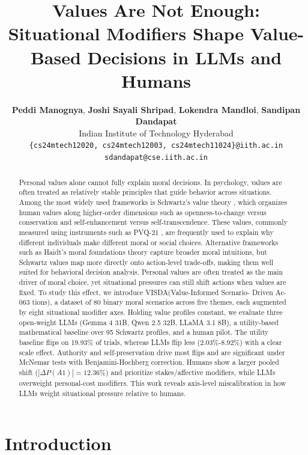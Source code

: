 \documentclass[11pt]{article}
\title{Values Are Not Enough: Situational Modifiers Shape Value-Based Decisions in LLMs and Humans}
\author{
  \textbf{Peddi Manognya}, 
  \textbf{Joshi Sayali Shripad}, 
  \textbf{Lokendra Mandloi}, 
  \textbf{Sandipan Dandapat} \\
  Indian Institute of Technology Hyderabad \\
  \small\texttt{\{cs24mtech12020, cs24mtech12003, cs24mtech11024\}@iith.ac.in} \\
  \small\texttt{sdandapat@cse.iith.ac.in}
}
\begin{document}
\maketitle

\begin{abstract}
\noindent
Personal values alone cannot fully explain moral decisions. In psychology, values are often treated as relatively stable principles that guide behavior across situations. Among the most widely used frameworks is Schwartz’s value theory \citep{schwartz2012refined}, which organizes human values along higher-order dimensions such as openness-to-change versus conservation and self-enhancement versus self-transcendence. These values, commonly measured using instruments such as PVQ-21 \citep{schwartz2003proposal}, are frequently used to explain why different individuals make different moral or social choices. Alternative frameworks such as Haidt’s moral foundations theory \citep{haidt2012righteous} capture broader moral intuitions, but Schwartz values map more directly onto action-level trade-offs, making them well suited for behavioral decision analysis.
Personal values are often treated as the main driver of moral choice, yet situational pressures can still shift actions when values are fixed. To study this effect, we introduce VISDA(Value-Informed Scenario- Driven Ac- 063
tions), a dataset of 80 binary moral scenarios across five themes, each augmented by eight situational modifier axes. Holding value profiles constant, we evaluate three open-weight LLMs (Gemma 4 31B, Qwen 2.5 32B, LLaMA 3.1 8B), a utility-based mathematical baseline over 95 Schwartz profiles, and a human pilot.
The utility baseline flips on 19.93\% of trials, whereas LLMs flip less (2.03\%-8.92\%) with a clear scale effect. Authority and self-preservation drive most flips and are significant under McNemar tests with Benjamini-Hochberg correction. Humans show a larger pooled shift ($|\Delta P(A1)|=12.36\%$) and prioritize stakes/affective modifiers, while LLMs overweight personal-cost modifiers. This work reveals axis-level miscalibration in how LLMs weight situational pressure relative to humans.
\end{abstract}

\section{Introduction}
\label{sec:intro}
\end{document}

